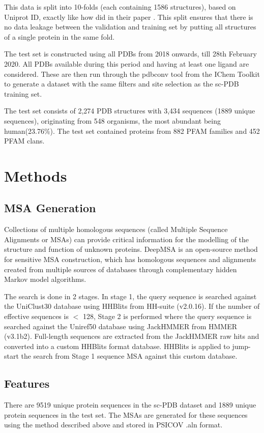 \documentclass[journal=jacsat,manuscript=article]{achemso}
\begin{document}
This data is split into 10-folds (each containing 1586 structures), based on Uniprot ID, exactly like how \citeauthor{stepniewska2020improving} did in their paper \cite{stepniewska2020improving}. This split ensures that there is no data leakage between the validation and training set by putting all structures of a single protein in the same fold.

The test set is constructed using all PDBs from 2018 onwards, till 28th February 2020. All PDBs available during this period and having at least one ligand are considered. These are then run through the pdbconv tool from the IChem Toolkit \cite{da2018ichem} to generate a dataset with the same filters and site selection as the sc-PDB training set.

The test set consists of 2,274 PDB structures with 3,434 sequences (1889 unique sequences), originating from 548 organisms, the most abundant being human(23.76\%). The test set contained proteins from 882 PFAM families and 452 PFAM clans.


\section{Methods}
\subsection{MSA Generation}
\quad Collections of multiple homologous sequences (called Multiple Sequence Alignments or MSAs) can provide critical information for the modelling of the structure and function of unknown proteins. DeepMSA \cite{zhang2020deepmsa} is an open-source method for sensitive MSA construction, which has homologous sequences and alignments created from multiple sources of databases through complementary hidden Markov model algorithms.

The search is done in 2 stages. In stage 1, the query sequence is searched against the UniClust30 \cite{mirdita2017uniclust} database using HHBlits from HH-suite\cite{remmert2012hhblits} (v2.0.16). If the number of effective sequences is $<$ 128, Stage 2 is performed where the query sequence is searched against the Uniref50 \cite{suzek2015uniref} database using JackHMMER from HMMER \cite{johnson2010hidden} (v3.1b2). Full-length sequences are extracted from the JackHMMER raw hits and converted into a custom HHBlits format database. HHBlits is applied to jump-start the search from Stage 1 sequence MSA against this custom database.


\subsection{Features}
\quad There are 9519 unique protein sequences in the sc-PDB dataset and 1889 unique protein sequences in the test set. The MSAs are generated for these sequences using the method described above and stored in PSICOV \cite{jones2012psicov} .aln format.
\end{document}

